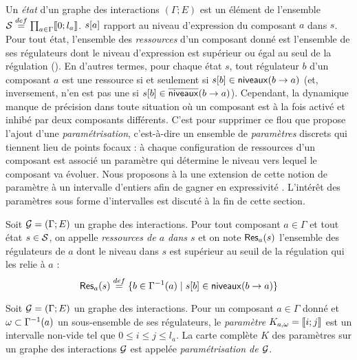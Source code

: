 Un \emph{état} d'un graphe des interactions $(\Gamma; E)$ est un élément de l'ensemble
$\mathcal{S} \stackrel{def}= \prod_{a \in \Gamma} \mathopen{\llbracket}0\mathclose{};l_a\mathclose{\rrbracket}$.
${s[a]}$ rapport au niveau d'expression du composant $a$ dans $s$.
Pour tout état, l'ensemble des \emph{ressources} d'un composant donné est
l'ensemble de ses régulateurs dont le niveau d'expression est supérieur ou égal au seul
de la régulation ().
En d'autres termes, pour chaque état $s$, tout régulateur $b$ d'un composant $a$
est une ressource si et seulement si ${s[b]} \in \mathsf{niveaux}(b\rightarrow a)$
(et, inversement, n'en est pas une si ${s[b]} \in \overline{\mathsf{niveaux}}(b\rightarrow a)$).
Cependant, la dynamique manque de précision dans toute situation où un
composant est à la fois activé et inhibé par deux composants différents.
C'est pour supprimer ce flou que  propose l'ajout d'une
\emph{paramétrisation},
c'est-à-dire un ensemble de \emph{paramètres} discrets
qui tiennent lieu de points focaux :
à chaque configuration de ressources d'un composant est associé un paramètre
qui détermine le niveau vers lequel le composant va évoluer.
Nous proposons à la  une extension de cette notion de paramètre
à un intervalle d'entiers afin de gagner en expressivité
\cite{FPIMR12-CMSB}.
L'intérêt des paramètres sous forme d'intervalles est discuté à la fin de cette section.

\begin{definition}
  Soit $\mathcal{G} = (\Gamma; E)$ un graphe des interactions.
  Pour tout composant $a \in \Gamma$ et tout état $s \in \mathcal{S}$,
  on appelle \emph{ressources de $a$ dans $s$} et on note $\mathsf{Res}_{a}(s)$
  l'ensemble des régulateurs de $a$ dont le niveau dans $s$ est supérieur au seuil
  de la régulation qui les relie à $a$ :
    \[\mathsf{Res}_{a}(s) \stackrel{def}= \{ b \in \Gamma^{-1}(a) \mid {s[b]} \in \mathsf{niveaux}(b\rightarrow a) \}\]
\end{definition}

\begin{definition}
  Soit $\mathcal{G} = (\Gamma; E)$ un graphe des interactions.
  Pour un composant $a \in \Gamma$ donné
  et $\omega \subset \Gamma^{-1}(a)$ un sous-ensemble de ses régulateurs,
  le \emph{paramètre} $K_{a,\omega} = \mathopen{\llbracket}i\mathclose{};j\mathclose{\rrbracket}$ est un intervalle non-vide tel que
  $0 \leq i \leq j \leq l_a$.
  La carte complète $K$ des paramètres sur un graphe des interactions $\mathcal{G}$
  est appelée \emph{paramétrisation de $\mathcal{G}$}.
\end{definition}

